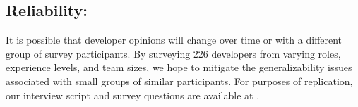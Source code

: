 \subsection{Reliability:}
It is possible that developer opinions will change over time or with a different group of survey participants. By surveying 226 developers from varying roles, experience levels, and team sizes, we hope to mitigate the generalizability issues associated with small groups of similar participants.
For purposes of replication, our interview script and survey questions are available at \cite{companion_site}. 

